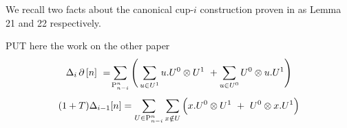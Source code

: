 We recall two facts about the canonical cup-$i$ construction proven in \cite{medina2021newformulas} as Lemma 21 and 22 respectively.

\begin{lemma} \label{l:from the other paper}
	PUT here the work on the other paper
	\begin{equation}
	\Delta_i \operatorname{\partial} \, [n] \ =\!
	\sum_{\mathrm{P}_{n-i}^n} \left( \,
	\sum_{u \in U^1} {u.U^0} \otimes {U^1} \ +
	\sum_{u \in U^0} {U^0} \otimes {u.U^1} \right)
	\end{equation}
	\begin{equation}
	(1+T) \Delta_{i-1} [n] =
	\sum_{U \in \P_{n-i}^n} \sum_{x \notin U} \Big( x.U^0 \ot U^1\ +\ {U^0} \ot {x.U^1} \Big)
	\end{equation}
\end{lemma}